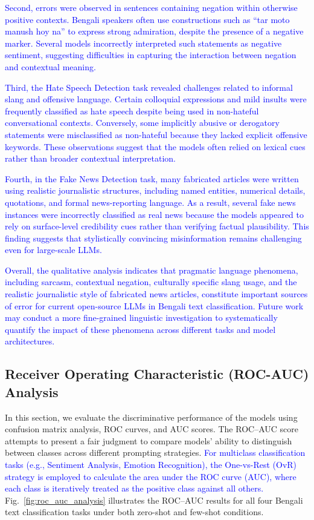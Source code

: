 \documentclass[10pt,letterpaper]{article}
\newcommand{\banglaNegationExample}{tar moto manush hoy na}
\newcommand{\banglaNegationExample}{{\bengalifont তার মতো মানুষ হয় না}}
\newcommand{\rev}[1]{\textcolor{blue}{#1}}
\begin{document}
\rev{Second, errors were observed in sentences containing negation within otherwise positive contexts. Bengali speakers often use constructions such as ``\banglaNegationExample'' to express strong admiration, despite the presence of a negative marker. Several models incorrectly interpreted such statements as negative sentiment, suggesting difficulties in capturing the interaction between negation and contextual meaning.}

\rev{Third, the Hate Speech Detection task revealed challenges related to informal slang and offensive language. Certain colloquial expressions and mild insults were frequently classified as hate speech despite being used in non-hateful conversational contexts. Conversely, some implicitly abusive or derogatory statements were misclassified as non-hateful because they lacked explicit offensive keywords. These observations suggest that the models often relied on lexical cues rather than broader contextual interpretation.}

\rev{Fourth, in the Fake News Detection task, many fabricated articles were written using realistic journalistic structures, including named entities, numerical details, quotations, and formal news-reporting language. As a result, several fake news instances were incorrectly classified as real news because the models appeared to rely on surface-level credibility cues rather than verifying factual plausibility. This finding suggests that stylistically convincing misinformation remains challenging even for large-scale LLMs.}

\rev{Overall, the qualitative analysis indicates that pragmatic language phenomena, including sarcasm, contextual negation, culturally specific slang usage, and the realistic journalistic style of fabricated news articles, constitute important sources of error for current open-source LLMs in Bengali text classification. Future work may conduct a more fine-grained linguistic investigation to systematically quantify the impact of these phenomena across different tasks and model architectures.}



\subsection*{Receiver Operating Characteristic (ROC-AUC) Analysis}
\label{sec:roc_auc_analysis}

In this section, we evaluate the discriminative performance of the models using confusion matrix analysis, ROC curves, and AUC scores. The ROC–AUC score attempts to present a fair judgment to compare models' ability to distinguish between classes across different prompting strategies. \rev{For multiclass classification tasks (e.g., Sentiment Analysis, Emotion Recognition), the One-vs-Rest (OvR) strategy is employed to calculate the area under the ROC curve (AUC), where each class is iteratively treated as the positive class against all others.} Fig.~\ref{fig:roc_auc_analysis} illustrates the ROC–AUC results for all four Bengali text classification tasks under both zero-shot and few-shot conditions.
\end{document}
